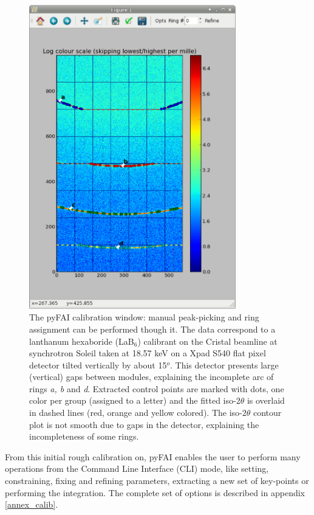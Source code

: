\documentclass{iucr}
\begin{document}
\begin{figure}
\label{calib}
\begin{center}
\includegraphics[width=9cm]{calib_xpad.eps}
\caption{The pyFAI calibration window: manual peak-picking and
ring assignment can be performed though it.
The data correspond to a lanthanum hexaboride (LaB$_6$) calibrant on the Cristal
beamline at synchrotron Soleil taken at 18.57 keV on a Xpad S540 flat pixel
detector tilted vertically by about 15$^o$.
This detector presents large (vertical) gaps between modules, explaining the
incomplete arc of rings \textit{a, b} and \textit{d}.
Extracted control points are marked with dots, one color per group (assigned to
a letter) and the fitted iso-$2\theta$ is overlaid in dashed lines
(red, orange and yellow colored).
The iso-$2\theta$ contour plot is not smooth due to gaps in the
detector, explaining the incompleteness of some rings.}
\end{center}
\end{figure}

From this initial rough calibration on, pyFAI enables  the user to perform
many operations from the Command Line Interface (CLI) mode, like setting,
constraining, fixing and  refining parameters, extracting a new set of
key-points or performing the integration.
The complete set of options is described in appendix \ref{annex_calib}.
\end{document}
